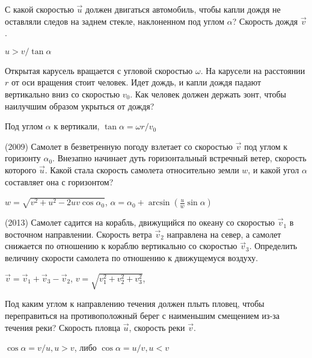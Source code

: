 \begin{ex}
С какой скоростью $\vec u$ должен двигаться автомобиль, чтобы капли дождя не оставляли следов на заднем стекле, наклоненном под углом $ \alpha $? Скорость дождя $\vec v$.
\begin{ans}
$u > v / \tan \alpha$
\end{ans}
\end{ex}

\begin{ex}
Открытая карусель вращается с угловой скоростью $\omega $. На карусели на расстоянии $r$ от оси вращения стоит человек. 
Идет дождь, и капли дождя падают вертикально вниз со скоростью $v_0$. 
Как человек должен держать зонт, чтобы наилучшим образом укрыться от дождя?
\begin{ans}
Под углом $\alpha$ к вертикали, $\tan \alpha = \omega r / v_0$
\end{ans}
\end{ex}

\begin{ex}
(2009) Самолет в безветренную погоду взлетает со скоростью $\vec v$  под углом к горизонту $\alpha_0$. Внезапно начинает дуть горизонтальный встречный ветер, скорость которого $\vec u$. Какой стала скорость самолета относительно земли $w$, и какой угол $\alpha$ составляет она с горизонтом?
\begin{ans}
$w = \sqrt{v^2 + u^2 - 2uv\cos \alpha_0}$,
$\alpha = \alpha_0 + \arcsin \left( \frac{u}{w} \sin \alpha \right)$
\end{ans}
\end{ex}

\begin{ex}
(2013) Самолет садится на корабль, движущийся по океану со скоростью $\vec{v}_1$ в восточном направлении. 
Скорость ветра $\vec{v}_2$ направлена на север, а самолет снижается по отношению к кораблю вертикально со скоростью $\vec{v}_3$. 
Определить величину скорости самолета по отношению к движущемуся воздуху.
\begin{ans}
$\vec{v} = \vec{v}_1 + \vec{v}_3 - \vec{v}_2$, 
$v = \sqrt{v_1^2 + v_2^2 + v_3^2}$, 
\end{ans}
\end{ex}

\begin{ex}
Под каким углом к направлению течения должен плыть пловец, 
чтобы переправиться на противоположный берег с наименьшим смещением из-за течения реки? 
Скорость пловца $\vec u$, скорость реки $\vec v$.
\begin{ans}
$\cos \alpha = v/u, u > v$, либо $\cos \alpha = u/v, u < v$
\end{ans}
\end{ex}

